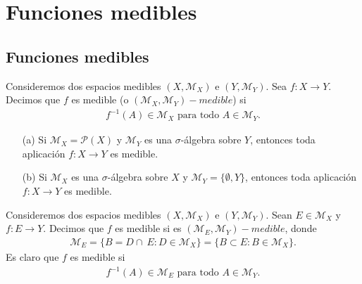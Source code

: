 \chapter{Funciones medibles}
\section{Funciones medibles}

\begin{defi}
    Consideremos dos espacios medibles $(X, \mathcal{M}_X)$ e $(Y, \mathcal{M}_Y)$. Sea $f : X \longrightarrow Y$. Decimos que $f$ es medible (o $(\mathcal{M}_X, \mathcal{M}_Y)-medible$) si
    \begin{align*}
        f^{-1}(A) \in \mathcal{M}_X \text{ para todo } A \in \mathcal{M}_Y.
    \end{align*}
\end{defi}

\begin{ejemplo}
    \begin{enumerate}
        \item[(a)] Si $\mathcal{M}_X = \mathcal{P}(X)$ y $\mathcal{M}_Y$ es una $\sigma$-álgebra sobre $Y$, entonces toda aplicación $f: X \longrightarrow Y$ es medible.
        \item[(b)] Si  $\mathcal{M}_X$ es una $\sigma$-álgebra sobre $X$ y $\mathcal{M}_Y = \{ \emptyset, Y \}$, entonces toda aplicación $f: X \longrightarrow Y$ es medible.
    \end{enumerate}
\end{ejemplo}
\begin{defi}
    Consideremos dos espacios medibles $(X, \mathcal{M}_X)$ e $(Y, \mathcal{M}_Y)$. Sean $E \in \mathcal{M}_X$ y $f : E \longrightarrow Y$. Decimos que $f$ es medible si es $(\mathcal{M}_E, \mathcal{M}_Y)-medible$, donde
    \begin{align*}
        \mathcal{M}_E = \{ B = D \cap \ E : D \in \mathcal{M}_X \} = \{ B \subset E : B \in \mathcal{M}_X \}.
    \end{align*}
    Es claro que $f$ es medible si
    \begin{align*}
        f^{-1}(A) \in \mathcal{M}_E \text{ para todo } A \in \mathcal{M}_Y.
    \end{align*}
\end{defi}

